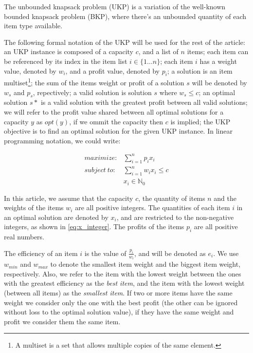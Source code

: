 \documentclass[runningheads,a4paper]{llncs}
\begin{document}
The unbounded knapsack problem (UKP) is a variation of the well-known bounded knapsack problem (BKP), where there's an unbounded quantity of each item type available.

The following formal notation of the UKP will be used for the rest of the article: an UKP instance is composed of a capacity \(c\), and a list of \(n\) items; each item can be referenced by its index in the item list \(i \in \{1\dots n\}\); each item \(i\) has a weight value, denoted by \(w_i\), and a profit value, denoted by \(p_i\); a solution is an item multiset\footnote{A multiset is a set that allows multiple copies of the same element.}; the sum of the items weight or profit of a solution \(s\) will be denoted by \(w_s\) and \(p_s\), repectively; a valid solution is solution \(s\) where \(w_s \leq c\); an optimal solution \(s*\) is a valid solution with the greatest profit between all valid solutions; we will refer to the profit value shared between all optimal solutions for a capacity \(y\) as \(opt(y)\), if we ommit the capacity then \(c\) is implied; the UKP objective is to find an optimal solution for the given UKP instance. In linear programming notation, we could write:

\begin{align}
  maximize: &\sum_{i=1}^n p_i x_i\label{eq:objfun}\\
subject~to: &\sum_{i=1}^n w_i x_i \leq c\label{eq:capcons}\\
            &x_i \in \mathbb{N}_0\label{eq:x_integer}
\end{align}

In this article, we assume that the capacity \(c\), the quantity of items \(n\) and the weights of the items \(w_i\) are all positive integers. The quantities of each item \(i\) in an optimal solution are denoted by \(x_i\), and are restricted to the non-negative integers, as shown in \eqref{eq:x_integer}. The profits of the items \(p_i\) are all positive real numbers.

The efficiency of an item \(i\) is the value of \(\frac{p_i}{w_i}\), and will be denoted as \(e_i\). We use \(w_{min}\) and \(w_{max}\) to denote the smallest item weight and the biggest item weight, respectively. Also, we refer to the item with the lowest weight between the ones with the greatest efficiency as the \emph{best item}, and the item with the lowest weight (between all items) as the \emph{smallest item}. If two or more items have the same weight we consider only the one with the best profit (the other can be ignored without loss to the optimal solution value), if they have the same weight and profit we consider them the same item.
\end{document}

